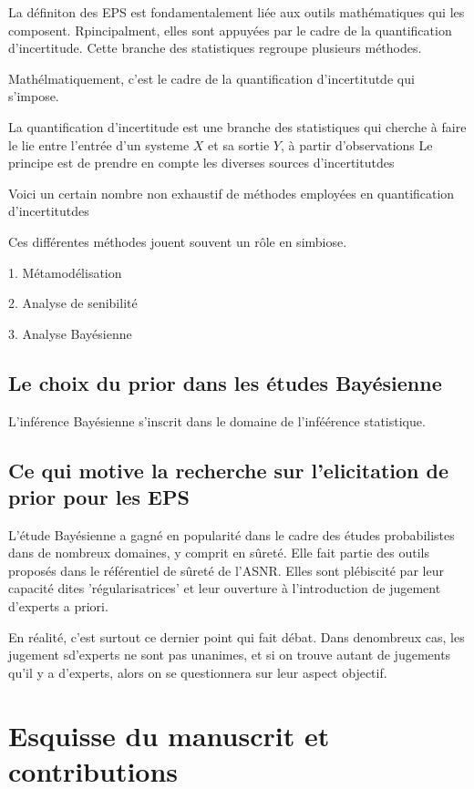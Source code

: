 

La définiton des EPS est fondamentalement liée aux outils mathématiques qui les composent. 
Rpincipalment, elles sont appuyées par le cadre %
de la quantification d'incertitude. Cette branche des statistiques regroupe plusieurs méthodes.

Mathélmatiquement, c'est le cadre de la quantification d'incertitutde qui s'impose.

La quantification d'incertitude est une branche des statistiques qui cherche à faire le lie entre l'entrée d'un systeme $X$ et sa sortie $Y$, à partir d'observations 
Le principe est de prendre en compte les diverses sources d'incertitutdes 



Voici un certain nombre non exhaustif de méthodes employées en quantification d'incertitutdes

Ces différentes méthodes jouent souvent un rôle en simbiose.


1. Métamodélisation 


2. Analyse de senibilité


3. Analyse Bayésienne




\subsection{Le choix du prior dans les études Bayésienne}

L'inférence Bayésienne s'inscrit dans le domaine de l'inféérence statistique.





\subsection{Ce qui motive la recherche sur l'elicitation de prior pour les EPS}


L'étude Bayésienne a gagné en popularité dans le cadre des études probabilistes dans de nombreux domaines, y comprit en sûreté. Elle fait partie des outils proposés dans le référentiel de sûreté de l'ASNR. 
Elles sont plébiscité par leur capacité dites 'régularisatrices' et leur ouverture à l'introduction de jugement d'experts a priori.

En réalité, c'est surtout ce dernier point qui fait débat. Dans denombreux cas, les jugement sd'experts ne sont pas unanimes, et si on trouve autant de jugements qu'il y a d'experts, alors on se questionnera sur leur aspect objectif.









\section{Esquisse du manuscrit et contributions}








